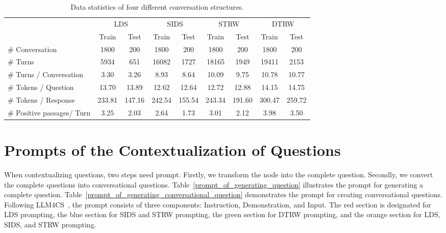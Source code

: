 \documentclass[11pt]{article}
\begin{document}
\begin{table}[h]
\centering
{}
\begin{tabular}{lcccccccc}
\toprule


& \multicolumn{2}{c}{LDS}& \multicolumn{2}{c}{SIDS} &  \multicolumn{2}{c}{STRW} & \multicolumn{2}{c}{DTRW}\\
\cmidrule(lr){2-3}
\cmidrule(lr){4-5}
\cmidrule(lr){6-7}
\cmidrule(lr){8-9}


 & Train &Test & Train &Test & Train &Test &Train &Test\\

 \midrule
\# Conversation & 1800 & 200 & 1800 & 200 & 1800 & 200 & 1800 & 200 \\
\midrule
\# Turns & 5934 & 651 & 16082 & 1727 & 18165 & 1949 & 19411 & 2153\\
\midrule
\# Turns / Conversation & 3.30 & 3.26 & 8.93 & 8.64 & 10.09 & 9.75 & 10.78 & 10.77\\
\midrule
\# Tokens / Question &13.70 &13.89 & 12.62 & 12.64 & 12.72 & 12.88 & 14.15 &14.75\\
\midrule
\# Tokens / Response & 233.81 & 147.16 & 242.54 & 155.54 & 243.34 & 191.60 & 300.47 & 259.72\\
\midrule
\# Positive passages/ Turn & 3.25 & 2.03 & 2.64 & 1.73 & 3.01 & 2.12 & 3.98 & 3.50\\
\bottomrule
\end{tabular}
\caption{Data statistics of four different conversation structures.}
\label{statistics_four_conversation_structures}
\end{table}







\section{Prompts of the Contextualization of Questions}
\label{prompts_of_contextualization_of_questions}

When contextualizing questions, two steps need prompt. Firstly, we transform the node into the complete question. Secondly, we convert the complete questions into conversational questions.
Table~\ref{prompt_of_generating_question} illustrates the prompt for generating a complete question.
Table~\ref{prompt_of_generating_conversational_question} demonstrates the prompt for creating conversational questions. Following LLM4CS~\citep{mao_emnlp23_llm4cs}, the prompt consists of three components: Instruction, Demonstration, and Input.
The red section is designated for LDS prompting, the blue section for SIDS and STRW prompting, the green section for DTRW prompting, and the orange section for LDS, SIDS, and STRW prompting.
\end{document}
